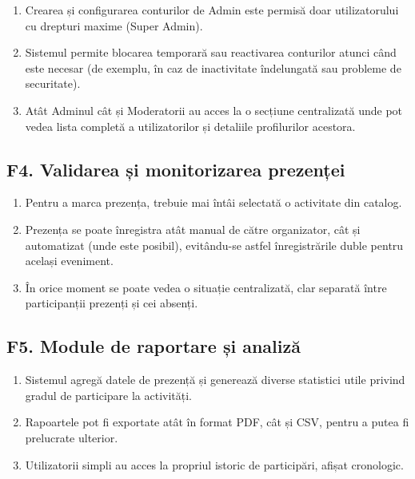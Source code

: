 \documentclass[11pt]{article}
\begin{document}
\begin{enumerate}[label=\textbf{F3.\arabic*}]
    \item Crearea și configurarea conturilor de Admin este permisă doar utilizatorului cu drepturi maxime (Super Admin).
    
    \item Sistemul permite blocarea temporară sau reactivarea conturilor atunci când este necesar (de exemplu, în caz de inactivitate îndelungată sau probleme de securitate).
    
    \item Atât Adminul cât și Moderatorii au acces la o secțiune centralizată unde pot vedea lista completă a utilizatorilor și detaliile profilurilor acestora.
\end{enumerate}

\subsection*{F4. Validarea și monitorizarea prezenței}

\begin{enumerate}[label=\textbf{F4.\arabic*}]
    \item Pentru a marca prezența, trebuie mai întâi selectată o activitate din catalog.
    
    \item Prezența se poate înregistra atât manual de către organizator, cât și automatizat (unde este posibil), evitându-se astfel înregistrările duble pentru același eveniment.
    
    \item În orice moment se poate vedea o situație centralizată, clar separată între participanții prezenți și cei absenți.
\end{enumerate}

\subsection*{F5. Module de raportare și analiză}

\begin{enumerate}[label=\textbf{F5.\arabic*}]
    \item Sistemul agregă datele de prezență și generează diverse statistici utile privind gradul de participare la activități.
    
    \item Rapoartele pot fi exportate atât în format PDF, cât și CSV, pentru a putea fi prelucrate ulterior.
    
    \item Utilizatorii simpli au acces la propriul istoric de participări, afișat cronologic.
\end{enumerate}
\end{document}
